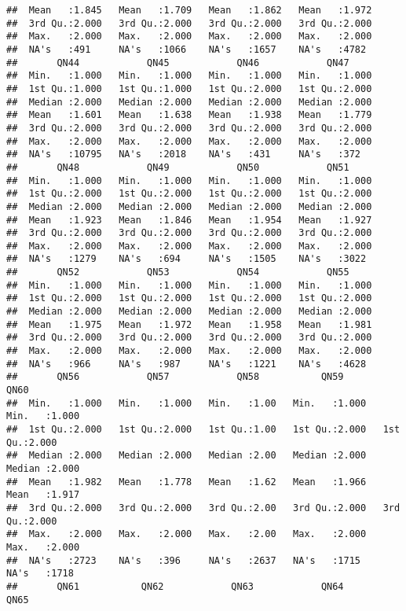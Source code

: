 \documentclass[
]{article}
\begin{document}
\begin{verbatim}
##  Mean   :1.845   Mean   :1.709   Mean   :1.862   Mean   :1.972  
##  3rd Qu.:2.000   3rd Qu.:2.000   3rd Qu.:2.000   3rd Qu.:2.000  
##  Max.   :2.000   Max.   :2.000   Max.   :2.000   Max.   :2.000  
##  NA's   :491     NA's   :1066    NA's   :1657    NA's   :4782   
##       QN44            QN45            QN46            QN47      
##  Min.   :1.000   Min.   :1.000   Min.   :1.000   Min.   :1.000  
##  1st Qu.:1.000   1st Qu.:1.000   1st Qu.:2.000   1st Qu.:2.000  
##  Median :2.000   Median :2.000   Median :2.000   Median :2.000  
##  Mean   :1.601   Mean   :1.638   Mean   :1.938   Mean   :1.779  
##  3rd Qu.:2.000   3rd Qu.:2.000   3rd Qu.:2.000   3rd Qu.:2.000  
##  Max.   :2.000   Max.   :2.000   Max.   :2.000   Max.   :2.000  
##  NA's   :10795   NA's   :2018    NA's   :431     NA's   :372    
##       QN48            QN49            QN50            QN51      
##  Min.   :1.000   Min.   :1.000   Min.   :1.000   Min.   :1.000  
##  1st Qu.:2.000   1st Qu.:2.000   1st Qu.:2.000   1st Qu.:2.000  
##  Median :2.000   Median :2.000   Median :2.000   Median :2.000  
##  Mean   :1.923   Mean   :1.846   Mean   :1.954   Mean   :1.927  
##  3rd Qu.:2.000   3rd Qu.:2.000   3rd Qu.:2.000   3rd Qu.:2.000  
##  Max.   :2.000   Max.   :2.000   Max.   :2.000   Max.   :2.000  
##  NA's   :1279    NA's   :694     NA's   :1505    NA's   :3022   
##       QN52            QN53            QN54            QN55      
##  Min.   :1.000   Min.   :1.000   Min.   :1.000   Min.   :1.000  
##  1st Qu.:2.000   1st Qu.:2.000   1st Qu.:2.000   1st Qu.:2.000  
##  Median :2.000   Median :2.000   Median :2.000   Median :2.000  
##  Mean   :1.975   Mean   :1.972   Mean   :1.958   Mean   :1.981  
##  3rd Qu.:2.000   3rd Qu.:2.000   3rd Qu.:2.000   3rd Qu.:2.000  
##  Max.   :2.000   Max.   :2.000   Max.   :2.000   Max.   :2.000  
##  NA's   :966     NA's   :987     NA's   :1221    NA's   :4628   
##       QN56            QN57            QN58           QN59            QN60      
##  Min.   :1.000   Min.   :1.000   Min.   :1.00   Min.   :1.000   Min.   :1.000  
##  1st Qu.:2.000   1st Qu.:2.000   1st Qu.:1.00   1st Qu.:2.000   1st Qu.:2.000  
##  Median :2.000   Median :2.000   Median :2.00   Median :2.000   Median :2.000  
##  Mean   :1.982   Mean   :1.778   Mean   :1.62   Mean   :1.966   Mean   :1.917  
##  3rd Qu.:2.000   3rd Qu.:2.000   3rd Qu.:2.00   3rd Qu.:2.000   3rd Qu.:2.000  
##  Max.   :2.000   Max.   :2.000   Max.   :2.00   Max.   :2.000   Max.   :2.000  
##  NA's   :2723    NA's   :396     NA's   :2637   NA's   :1715    NA's   :1718   
##       QN61           QN62            QN63            QN64            QN65      

\end{verbatim}
\end{document}
